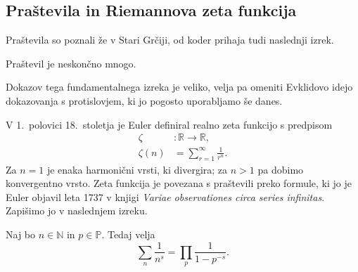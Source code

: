 \documentclass[mat1]{fmfdelo}
\begin{document}
\subsection{Praštevila in Riemannova zeta funkcija}

Praštevila so poznali že v Stari Grčiji, od koder prihaja tudi naslednji izrek.
\begin{izrek}[Evklid]
Praštevil je neskončno mnogo.
\end{izrek}

Dokazov tega fundamentalnega izreka je veliko, velja pa omeniti Evklidovo idejo dokazovanja s protislovjem, ki jo pogosto uporabljamo še danes.

V 1.~polovici 18.~stoletja je Euler definiral realno zeta funkcijo s predpisom
\begin{align}
\zeta &\colon \mathbb{R} \rightarrow \mathbb{R}, \nonumber \\
\zeta(n) &= \sum_{r=1}^{\infty}\frac{1}{r^n}.
\end{align}
Za $n=1$ je enaka harmonični vrsti, ki divergira; za $n>1$ pa dobimo konvergentno vrsto. Zeta funkcija je povezana s praštevili preko formule, ki jo je Euler objavil leta 1737 v knjigi \emph{Variae observationes circa series infinitas}. Zapišimo jo v naslednjem izreku.

\begin{izrek}
\label{izr:EulProdukt}
Naj bo $n\in\mathbb{N}$ in $p\in\mathbb{P}$. Tedaj velja
\begin{equation}
\sum_{n}\frac{1}{n^s} = \prod_{p}\frac{1}{1-p^{-s}}.
\end{equation}
\end{izrek}
\end{document}
